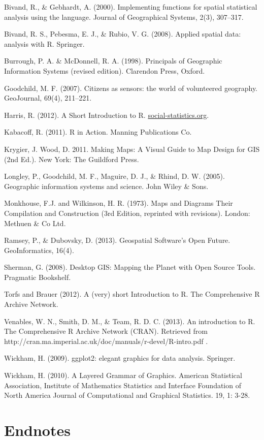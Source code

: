 \documentclass[]{article}
\begin{document}
Bivand, R., \& Gebhardt, A. (2000). Implementing functions for spatial
statistical analysis using the language. Journal of Geographical
Systems, 2(3), 307--317.

Bivand, R. S., Pebesma, E. J., \& Rubio, V. G. (2008). Applied spatial
data: analysis with R. Springer.

Burrough, P. A. \& McDonnell, R. A. (1998). Principals of Geographic
Information Systems (revised edition). Clarendon Press, Oxford.

Goodchild, M. F. (2007). Citizens as sensors: the world of volunteered
geography. GeoJournal, 69(4), 211--221.

Harris, R. (2012). A Short Introduction to R.
\href{http://www.social-statistics.org/}{social-statistics.org}.

Kabacoff, R. (2011). R in Action. Manning Publications Co.

Krygier, J. Wood, D. 2011. Making Maps: A Visual Guide to Map Design for
GIS (2nd Ed.). New York: The Guildford Press.

Longley, P., Goodchild, M. F., Maguire, D. J., \& Rhind, D. W. (2005).
Geographic information systems and science. John Wiley \& Sons.

Monkhouse, F.J. and Wilkinson, H. R. (1973). Maps and Diagrams Their
Compilation and Construction (3rd Edition, reprinted with revisions).
London: Methuen \& Co Ltd.

Ramsey, P., \& Dubovsky, D. (2013). Geospatial Software's Open Future.
GeoInformatics, 16(4).

Sherman, G. (2008). Desktop GIS: Mapping the Planet with Open Source
Tools. Pragmatic Bookshelf.

Torfs and Brauer (2012). A (very) short Introduction to R. The
Comprehensive R Archive Network.

Venables, W. N., Smith, D. M., \& Team, R. D. C. (2013). An introduction
to R. The Comprehensive R Archive Network (CRAN). Retrieved from
http://cran.ma.imperial.ac.uk/doc/manuals/r-devel/R-intro.pdf .

Wickham, H. (2009). ggplot2: elegant graphics for data analysis.
Springer.

Wickham, H. (2010). A Layered Grammar of Graphics. American Statistical
Association, Institute of Mathematics Statistics and Interface
Foundation of North America Journal of Computational and Graphical
Statistics. 19, 1: 3-28.

\section{Endnotes}
\end{document}
